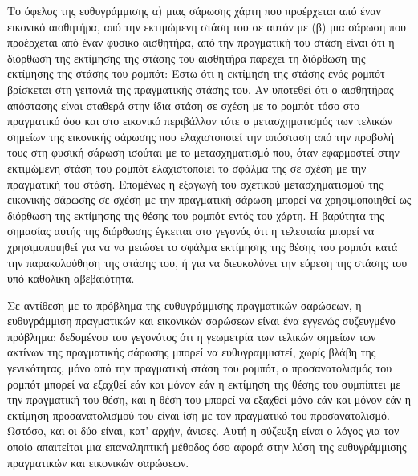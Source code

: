 \begin{bw_box}
\begin{remark}
Το όφελος της ευθυγράμμισης α) μιας σάρωσης χάρτη που προέρχεται από έναν
εικονικό αισθητήρα, από την εκτιμώμενη στάση του σε αυτόν με (β) μια σάρωση
που προέρχεται από έναν φυσικό αισθητήρα, από την πραγματική του στάση είναι
ότι η διόρθωση της εκτίμησης της στάσης του αισθητήρα παρέχει τη διόρθωση της
εκτίμησης της στάσης του ρομπότ: Έστω ότι η εκτίμηση της στάσης ενός ρομπότ
βρίσκεται στη γειτονιά της πραγματικής στάσης του. Αν υποτεθεί ότι ο
αισθητήρας απόστασης είναι σταθερά στην ίδια στάση σε σχέση με το ρομπότ τόσο
στο πραγματικό όσο και στο εικονικό περιβάλλον τότε ο μετασχηματισμός των
τελικών σημείων της εικονικής σάρωσης που ελαχιστοποιεί την απόσταση από την
προβολή τους στη φυσική σάρωση ισούται με το μετασχηματισμό που, όταν
εφαρμοστεί στην εκτιμώμενη στάση του ρομπότ ελαχιστοποιεί το σφάλμα της σε
σχέση με την πραγματική του στάση. Επομένως η εξαγωγή του σχετικού
μετασχηματισμού της εικονικής σάρωσης σε σχέση με την πραγματική σάρωση
μπορεί να χρησιμοποιηθεί ως διόρθωση της εκτίμησης της θέσης του ρομπότ εντός
του χάρτη. Η βαρύτητα της σημασίας αυτής της διόρθωσης έγκειται στο γεγονός
ότι η τελευταία μπορεί να χρησιμοποιηθεί για να να μειώσει το σφάλμα
εκτίμησης της θέσης του ρομπότ κατά την παρακολούθηση της στάσης του, ή για
να διευκολύνει την εύρεση της στάσης του υπό καθολική αβεβαιότητα.
\end{remark}
\end{bw_box}

\begin{bw_box}
\begin{remark}
\label{rem:iterative}
Σε αντίθεση με το πρόβλημα της ευθυγράμμισης πραγματικών σαρώσεων, η
ευθυγράμμιση πραγματικών και εικονικών σαρώσεων είναι ένα εγγενώς συζευγμένο
πρόβλημα: δεδομένου του γεγονότος ότι η γεωμετρία των τελικών σημείων των
ακτίνων της πραγματικής σάρωσης μπορεί να ευθυγραμμιστεί, χωρίς βλάβη της
γενικότητας, μόνο από την πραγματική στάση του ρομπότ, ο προσανατολισμός του
ρομπότ μπορεί να εξαχθεί εάν και μόνον εάν η εκτίμηση της θέσης του συμπίπτει
με την πραγματική του θέση, και η θέση του μπορεί να εξαχθεί μόνο εάν και
μόνον εάν η εκτίμηση προσανατολισμού του είναι ίση με τον πραγματικό του
προσανατολισμό. Ωστόσο, και οι δύο είναι, κατ' αρχήν, άνισες. Αυτή η σύζευξη
είναι ο λόγος για τον οποίο απαιτείται μια επαναληπτική μέθοδος όσο αφορά
στην λύση της ευθυγράμμισης πραγματικών και εικονικών σαρώσεων.
\end{remark}
\end{bw_box}

